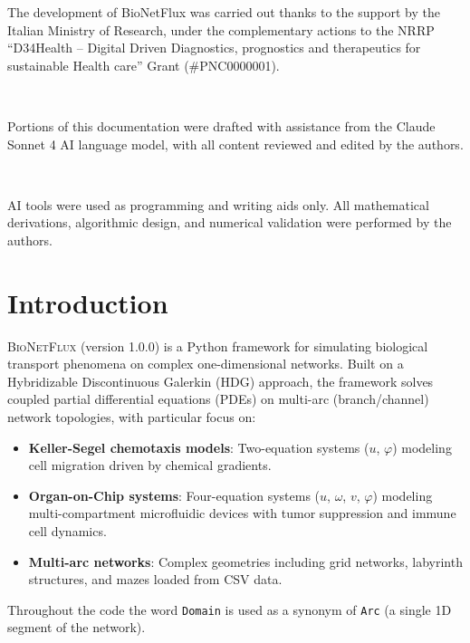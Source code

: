 \documentclass[11pt,a4paper]{article}
\newcommand{\code}[1]{\texttt{#1}}
\newcommand{\bionetflux}{\textsc{BioNetFlux}}
\begin{document}
The development of BioNetFlux was carried out thanks to the support by the Italian Ministry of Research, under the complementary actions to the NRRP ``D34Health -- Digital Driven Diagnostics, prognostics and therapeutics for sustainable Health care'' Grant (\#PNC0000001).

\

Portions of this documentation were drafted with assistance from the Claude Sonnet 4 AI language model, with all content reviewed and edited by the authors.

\

AI tools were used as programming and writing aids only. All mathematical derivations,
algorithmic design, and numerical validation were performed by the authors.
\clearpage

\section{Introduction}
\label{sec:introduction}

\bionetflux{} (version 1.0.0) is a Python framework for simulating biological transport phenomena on complex one-dimensional networks. Built on a Hybridizable Discontinuous Galerkin (HDG) approach, the framework solves coupled partial differential equations (PDEs) on multi-arc (branch/channel) network topologies, with particular focus on:

\begin{itemize}
    \item \textbf{Keller-Segel chemotaxis models}: Two-equation systems ($u$, $\varphi$) modeling cell migration driven by chemical gradients.
    \item \textbf{Organ-on-Chip systems}: Four-equation systems ($u$, $\omega$, $v$, $\varphi$) modeling multi-compartment microfluidic devices with tumor suppression and immune cell dynamics.
    \item \textbf{Multi-arc networks}: Complex geometries including grid networks, labyrinth structures, and mazes loaded from CSV data.
\end{itemize}

\begin{notebox}
Throughout the code the word \code{Domain} is used as a synonym of \code{Arc} (a single 1D segment of the network).
\end{notebox}
\end{document}
